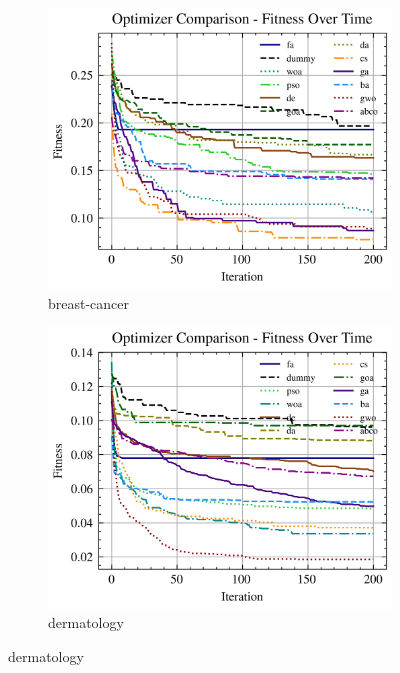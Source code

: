 \begin{figure}[htp]
    \centering
    \begin{subfigure}[htp]{0.45\textwidth}
        \includegraphics[width=\textwidth]{imagenes/fitness_charts/img/real/breast-cancer/optimizers_fitness_svc.png}
        \caption{breast-cancer}
    \end{subfigure}
    \begin{subfigure}[htp]{0.45\textwidth}
        \includegraphics[width=\textwidth]{imagenes/fitness_charts/img/real/dermatology/optimizers_fitness_svc.png}
        \caption{dermatology}

\end{subfigure}
\end{figure}
